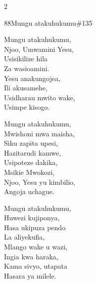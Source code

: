\begin{multicols}{2}
\begin{hymn}{88}{Mungu atakuhukumu}{\#135}
\begin{stanza}
Mungu atakuhukumu,\\
Njoo, Umwamini Yesu,\\
Usisikilize hila\\
Za wasioamini.\\
Yesu anakungojea,\\
Ili akusamehe,\\
Usidharau mwito wake,\\
Usimpe kisogo.
\end{stanza}
\begin{stanza}
Mungu atakuhukumu,\\
Mwishoni mwa maisha,\\
Siku zapita upesi,\\
Hazitarudi kamwe,\\
Usipoteze dakika,\\
Msikie Mwokozi,\\
Njoo, Yesu yu kimbilio,\\
Angoja uchague.
\end{stanza}
\begin{stanza}
Mungu atakuhukumu,\\
Huwezi kujiponya,\\
Hasa ukipuza pendo\\
La aliyekufia,\\
Mlango wake u wazi,\\
Ingia kwa haraka,\\
Kama sivyo, utapata\\
Hasara ya milele.
\end{stanza}
\end{hymn}


\end{multicols}
